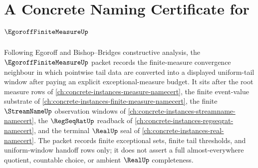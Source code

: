 \chapter{A Concrete Naming Certificate for $\EgoroffFiniteMeasureUp$}
\label{ch:concrete-instances-egoroff-finite-measure-namecert}

Following Egoroff and Bishop--Bridges constructive analysis, the $\EgoroffFiniteMeasureUp$ packet records the finite-measure convergence neighbour in which pointwise tail data are converted into a displayed uniform-tail window after paying an explicit exceptional-measure budget. It sits after the root measure rows of \autoref{ch:concrete-instances-measure-namecert}, the finite event-value substrate of \autoref{ch:concrete-instances-finite-measure-namecert}, the finite $\StreamNameUp$ observation windows of \autoref{ch:concrete-instances-streamname-namecert}, the $\RegSeqRatUp$ readback of \autoref{ch:concrete-instances-regseqrat-namecert}, and the terminal $\RealUp$ seal of \autoref{ch:concrete-instances-real-namecert}. The packet records finite exceptional sets, finite tail thresholds, and uniform-window handoff rows only; it does not assert a full almost-everywhere quotient, countable choice, or ambient $\RealUp$ completeness.

